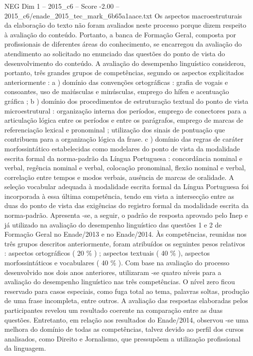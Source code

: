 \begin{textsample}{NEG Dim 1 – 2015\_c6 – Score -2.00 – 2015\_c6/enade\_2015\_tec\_mark\_6b65a1aace.txt}
Os aspectos macroestruturais da elaboração do texto não foram avaliados neste processo porque dizem respeito à avaliação do conteúdo.
Portanto, a banca de Formação Geral, composta por profissionais de diferentes áreas do conhecimento, se encarregou da avaliação do atendimento ao solicitado no enunciado das questões do ponto de vista do desenvolvimento do conteúdo.
A avaliação do desempenho linguístico considerou, portanto, três grandes grupos de competências, segundo os aspectos explicitados anteriormente : a ) domínio das convenções ortográficas : grafia de vogais e consoantes, uso de maiúsculas e minúsculas, emprego do hífen e acentuação gráfica ; b ) domínio dos procedimentos de estruturação textual do ponto de vista microestrutural : organização interna dos períodos, emprego de conectores para a articulação lógica entre os períodos e entre os parágrafos, emprego de marcas de referenciação lexical e pronominal ; utilização dos sinais de pontuação que contribuem para a organização lógica da frase. c ) domínio das regras de caráter morfossintático estabelecidas como modelares do ponto de vista da modalidade escrita formal da norma-padrão da Língua Portuguesa : concordância nominal e verbal, regência nominal e verbal, colocação pronominal, flexão nominal e verbal, correlação entre tempos e modos verbais, ausência de marcas de oralidade.
A seleção vocabular adequada à modalidade escrita formal da Língua Portuguesa foi incorporada à essa última competência, tendo em vista a intersecção entre as duas do ponto de vista das exigências do registro formal da modalidade escrita da norma-padrão.
Apresenta -se, a seguir, o padrão de resposta aprovado pelo Inep e já utilizado na avaliação do desempenho linguístico das questões 1 e 2 de Formação Geral no Enade/2013 e no Enade/2014.
Às competências, reunidas nos três grupos descritos anteriormente, foram atribuídos os seguintes pesos relativos : aspectos ortográficos ( 20 \% ) ; aspectos textuais ( 40 \% ), aspectos morfossintáticos e vocabulares ( 40 \% ).
Com base na avaliação do processo desenvolvido nos dois anos anteriores, utilizaram -se quatro níveis para a avaliação do desempenho linguístico nas três competências.
O nível zero ficou reservado para casos especiais, como fuga total ao tema, palavras soltas, produção de uma frase incompleta, entre outros.
A avaliação das respostas elaboradas pelos participantes revelou um resultado coerente na comparação entre as duas questões.
Entretanto, em relação aos resultados do Enade/2014, observou -se uma melhora do domínio de todas as competências, talvez devido ao perfil dos cursos analisados, como Direito e Jornalismo, que pressupõem a utilização profissional da linguagem.

\end{textsample}
